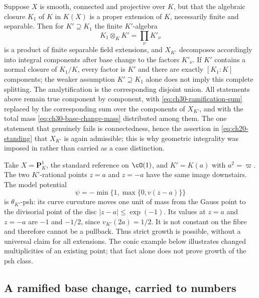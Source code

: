 \begin{remark}
\label{rem:ch30-not-geometrically-integral}
Suppose $X$ is smooth, connected and projective over $K$, but that the
algebraic closure $K_1$ of $K$ in $K(X)$ is a proper extension of
$K$, necessarily finite and separable.  Then for $K'\supseteq K_1$ the
finite $K'$-algebra
\[
                         K_1\otimes_KK'=\prod_\nu K'_\nu
\]
is a product of finite separable field extensions, and $X_{K'}$ decomposes
accordingly into integral components after base change to the factors
$K'_\nu$.  If $K'$ contains a normal closure of $K_1/K$, every factor
is $K'$ and there are exactly $[K_1:K]$ components; the weaker
assumption $K'\supseteq K_1$ alone does not imply this complete splitting.
The analytification is the corresponding disjoint union.  All statements
above remain true component by component,
with \eqref{eq:ch30-ramification-sum} replaced by the corresponding sum
over the components of $X_{K'}$, and with the total mass
\eqref{eq:ch30-base-change-mass} distributed among them.  The one statement
that genuinely fails is connectedness, hence the assertion in
\eqref{eq:ch20-standing} that $X_{K'}$ is again admissible; this is why
geometric integrality was imposed in  rather than
carried as a case distinction.
\end{remark}

\begin{remark}
\label{rem:ch30-psh-grows}
Take $X=\mathbf P^1_K$, the standard reference on $\cO(1)$, and
$K'=K(a)$ with $a^2=\varpi$.  The two $K'$-rational points $z=a$
and $z=-a$ have the same image downstairs.  The model potential
\[
 \psi=-\min\{1,\max\{0,v(z-a)\}\}
\]
is $\theta_{K'}$-psh: its curve curvature moves one unit of mass
from the Gauss point to the divisorial point of the disc
$|z-a|\leq\exp(-1)$.  Its values at $z=a$ and $z=-a$ are $-1$
and $-1/2$, since $v_{K'}(2a)=1/2$.
It is not constant on the fibre and therefore cannot be a pullback.
Thus strict growth is possible, without a universal claim for all
extensions.  The conic example below illustrates changed multiplicities
of an existing point; that fact alone does not prove growth of the
psh class.
\end{remark}

\subsection{A ramified base change, carried to numbers}
\label{sec:ch30-bc-example}

